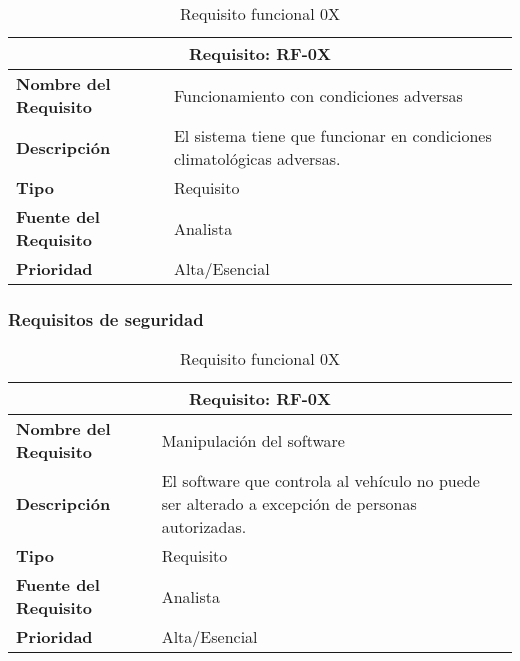 \begin{table}[H]
\begin{center}
\begin{tabular}{p{} p{7cm}}
\multicolumn{2}{c}{\textbf{Requisito: RF-0X} } \\
\hline \hline
\textbf{Nombre del Requisito} & Funcionamiento con condiciones adversas\\
\hline
\textbf{Descripción} & El sistema tiene que funcionar en condiciones climatológicas adversas.\\
\hline
\textbf{Tipo} & Requisito  \\
\hline
\textbf{Fuente del Requisito} & Analista  \\
\hline
\textbf{Prioridad} & Alta/Esencial \\ \hline
\end{tabular}
\caption{Requisito funcional 0X}
\label{tab:personal}
\end{center}
\end{table}


\subsubsection{Requisitos de seguridad}

\begin{table}[H]
\begin{center}
\begin{tabular}{p{} p{7cm}}
\multicolumn{2}{c}{\textbf{Requisito: RF-0X} } \\
\hline \hline
\textbf{Nombre del Requisito} & Manipulación del software\\
\hline
\textbf{Descripción} & El software que controla al vehículo no puede ser alterado a excepción de personas autorizadas.\\
\hline
\textbf{Tipo} & Requisito  \\
\hline
\textbf{Fuente del Requisito} & Analista  \\
\hline
\textbf{Prioridad} & Alta/Esencial \\ \hline
\end{tabular}
\caption{Requisito funcional 0X}
\label{tab:personal}
\end{center}
\end{table}

